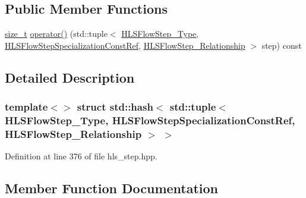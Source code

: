 \subsection*{Public Member Functions}
\begin{DoxyCompactItemize}
\item 
\hyperlink{tutorial__fpt__2017_2intro_2sixth_2test_8c_a7c94ea6f8948649f8d181ae55911eeaf}{size\+\_\+t} \hyperlink{structstd_1_1hash_3_01std_1_1tuple_3_01HLSFlowStep__Type_00_01HLSFlowStepSpecializationConstRef_bc8b707a477881811f135e704822f95e_a1b3a7359d1ce7c2b0b8064f4ca0a8867}{operator()} (std\+::tuple$<$ \hyperlink{hls__step_8hpp_ada16bc22905016180e26fc7e39537f8d}{H\+L\+S\+Flow\+Step\+\_\+\+Type}, \hyperlink{hls__step_8hpp_a5fdd2edf290c196531d21d68e13f0e74}{H\+L\+S\+Flow\+Step\+Specialization\+Const\+Ref}, \hyperlink{hls__step_8hpp_a3ad360b9b11e6bf0683d5562a0ceb169}{H\+L\+S\+Flow\+Step\+\_\+\+Relationship} $>$ step) const
\end{DoxyCompactItemize}


\subsection{Detailed Description}
\subsubsection*{template$<$$>$\newline
struct std\+::hash$<$ std\+::tuple$<$ H\+L\+S\+Flow\+Step\+\_\+\+Type, H\+L\+S\+Flow\+Step\+Specialization\+Const\+Ref, H\+L\+S\+Flow\+Step\+\_\+\+Relationship $>$ $>$}



Definition at line 376 of file hls\+\_\+step.\+hpp.



\subsection{Member Function Documentation}
\mbox{\label{structstd_1_1hash_3_01std_1_1tuple_3_01HLSFlowStep__Type_00_01HLSFlowStepSpecializationConstRef_bc8b707a477881811f135e704822f95e_a1b3a7359d1ce7c2b0b8064f4ca0a8867}} 
